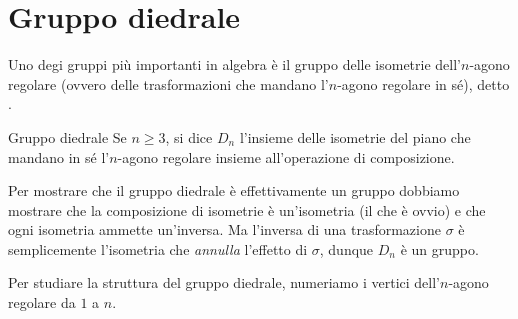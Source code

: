 \section{Gruppo diedrale}

Uno degi gruppi più importanti in algebra è il gruppo delle isometrie dell'$n$-agono regolare (ovvero delle trasformazioni che mandano l'$n$-agono regolare in sé), detto .

\begin{definition}
    {Gruppo diedrale}{}
    Se $n \geq 3$, si dice  $D_n$ l'insieme delle isometrie del piano che mandano in sé l'$n$-agono regolare insieme all'operazione di composizione. 
\end{definition}

Per mostrare che il gruppo diedrale è effettivamente un gruppo dobbiamo mostrare che la composizione di isometrie è un'isometria (il che è ovvio) e che ogni isometria ammette un'inversa. Ma l'inversa di una trasformazione $\sigma$  è semplicemente l'isometria che \emph{annulla} l'effetto di $\sigma$, dunque $D_n$ è un gruppo.

Per studiare la struttura del gruppo diedrale, numeriamo i vertici dell'$n$-agono regolare da $1$ a $n$.


